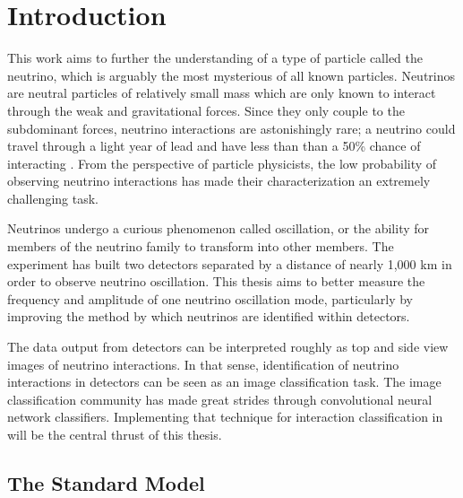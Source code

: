 \chapter{Introduction}
\label{intro_chapter}


This work aims to further the understanding of a type of particle called
the neutrino, which is arguably the most mysterious of all known particles.
Neutrinos are neutral particles of relatively small mass which are only
known to interact through the weak and gravitational forces.
Since they only couple to the subdominant forces, neutrino interactions are
astonishingly rare; a neutrino could travel through a light year of lead and
have less than than a 50\% chance of interacting \cite{petit2013heart}.
From the perspective of particle
physicists, the low probability of observing neutrino interactions has made
their characterization an extremely challenging task.

Neutrinos undergo a curious phenomenon called oscillation, or the ability for
members of the neutrino family to transform into other members.  The \nova
experiment has built two detectors separated by a distance of nearly 1,000 km
in order to observe neutrino oscillation.  This thesis aims to better measure
the frequency and amplitude of one neutrino oscillation mode, particularly by
improving the
method by which neutrinos are identified within \nova detectors.


The data output from \nova detectors can be interpreted roughly as top and side
view images of neutrino interactions.  In that sense, identification of
neutrino interactions in \nova detectors can be seen as an image classification
task.  The image classification community has made great strides through
convolutional neural network classifiers.  Implementing that technique for
interaction classification in \nova will be the central thrust of this thesis.



\section{The Standard Model}


